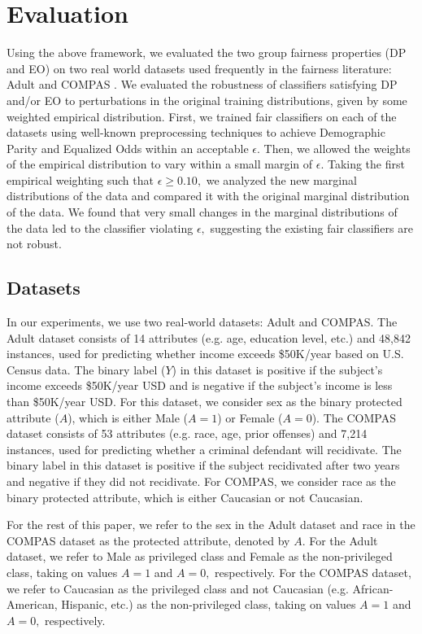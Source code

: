 \documentclass[11pt]{article}
\renewcommand{\cite}{\parencite}
\begin{document}
\section{Evaluation}
Using the above framework, we evaluated the two group fairness properties (DP and EO) on two real world datasets used frequently in the fairness literature: Adult \cite{Adult} and COMPAS \cite{COMPAS}. We evaluated the robustness of classifiers satisfying DP and/or EO to perturbations in the original training distributions, given by some weighted empirical distribution. First, we trained fair classifiers on each of the datasets using well-known preprocessing techniques to achieve Demographic Parity and Equalized Odds within an acceptable $\epsilon$. Then, we allowed the weights of the empirical distribution to vary within a small margin of $\epsilon.$ Taking the first empirical weighting such that $\epsilon \geq 0.10,$ we analyzed the new marginal distributions of the data and compared it with the original marginal distribution of the data. 
We found that very small changes in the marginal distributions of the data led to the classifier violating $\epsilon,$ suggesting the existing fair classifiers are not robust. 

\subsection{Datasets}
In our experiments, we use two real-world datasets: Adult and COMPAS. The Adult dataset consists of 14 attributes (e.g. age, education level, etc.) and 48,842 instances, used for predicting whether income exceeds \$50K/year based on U.S. Census data. The binary label ($Y$) in this dataset is positive if the subject's income exceeds \$50K/year USD and is negative if the subject's income is less than \$50K/year USD. For this dataset, we consider sex as the binary protected attribute ($A$), which is either Male ($A = 1$) or Female ($A = 0$). The COMPAS dataset consists of 53 attributes (e.g. race, age, prior offenses) and 7,214 instances, used for predicting whether a criminal defendant will recidivate. The binary label in this dataset is positive if the subject recidivated after two years and negative if they did not recidivate. For COMPAS, we consider race as the binary protected attribute, which is either Caucasian or not Caucasian. 
\par
For the rest of this paper, we refer to the sex in the Adult dataset and race in the COMPAS dataset as the protected attribute, denoted by $A.$ For the Adult dataset, we refer to Male as privileged class and Female as the non-privileged class, taking on values $A = 1$ and $A = 0,$ respectively. For the COMPAS dataset, we refer to Caucasian as the privileged class and not Caucasian (e.g. African-American, Hispanic, etc.) as the non-privileged class, taking on values $A = 1$ and $A = 0,$ respectively.
\end{document}
